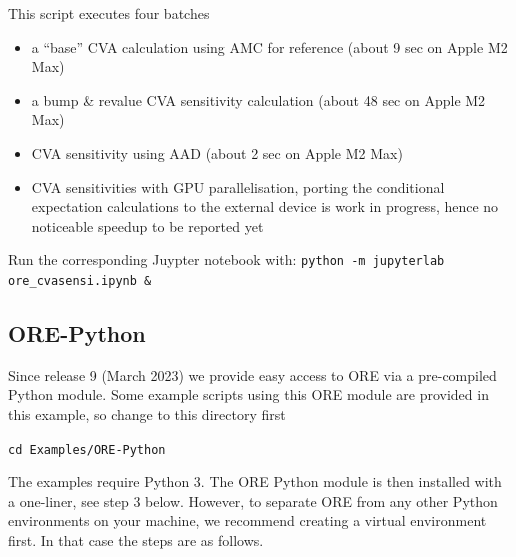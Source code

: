 This script executes four batches
\begin{itemize}
\item a ``base'' CVA calculation using AMC for reference (about 9 sec on Apple M2 Max)
\item a bump \& revalue CVA sensitivity calculation (about 48 sec on Apple M2 Max)
\item CVA sensitivity using AAD (about 2 sec on Apple M2 Max)
\item CVA sensitivities with GPU parallelisation, porting the conditional expectation calculations
  to the external device is work in progress, hence no noticeable speedup to be reported yet
\end{itemize}

Run the corresponding Juypter notebook with: {\tt python -m jupyterlab ore\_cvasensi.ipynb \&}

\subsection{ORE-Python}\label{example:orepython}

Since release 9 (March 2023) we provide easy access to ORE via a pre-compiled Python module. Some example scripts using
this ORE module are provided in this example, so change to this directory first

\medskip
{\tt cd Examples/ORE-Python}

\medskip
The examples require Python 3. The ORE Python module is then installed with a one-liner, see step 3 below. However, to
separate ORE from any other Python environments on your machine, we recommend creating a virtual environment first.
In that case the steps are as follows.

